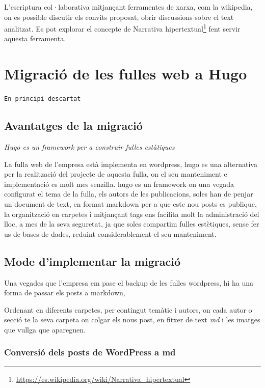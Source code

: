 \documentclass[
  10pt,
]{krantz}
\DeclareRobustCommand{\href}[2]{#2\footnote{\url{#1}}}
\begin{document}
L'escriptura col·laborativa mitjançant ferramentes de xarxa, com la wikipedia, on es possible discutir els convits proposat, obrir discussions sobre el text analitzat. Es pot explorar el concepte de \href{https://es.wikipedia.org/wiki/Narrativa_hipertextual}{Narrativa hipertextual} fent servir aquesta ferramenta.

\hypertarget{migraciuxf3-de-les-fulles-web-a-hugo}{%
\chapter{Migració de les fulles web a Hugo}\label{migraciuxf3-de-les-fulles-web-a-hugo}}

\texttt{En\ principi\ descartat}

\hypertarget{avantatges-de-la-migraciuxf3}{%
\section{Avantatges de la migració}\label{avantatges-de-la-migraciuxf3}}

\emph{Hugo es un framework per a construir fulles estàtiques}

La fulla web de l'empresa està implementa en wordpress, hugo es una alternativa per la realització del projecte de aquesta fulla, on el seu manteniment e implementació es molt mes senzilla. hugo es un framework on una vegada configurat el tema de la fulla, els autors de les publicacions, soles han de penjar un document de text, en format markdown per a que este nou posts es publique, la organització en carpetes i mitjançant tags ens facilita molt la administració del lloc, a mes de la seva seguretat, ja que soles compartim fulles estètiques, sense fer us de bases de dades, reduint considerablement el seu manteniment.

\hypertarget{mode-dimplementar-la-migraciuxf3}{%
\section{Mode d'implementar la migració}\label{mode-dimplementar-la-migraciuxf3}}

Una vegades que l'empresa em pase el backup de les fulles wordpress, hi ha una forma de passar els posts a markdown,

Ordenant en diferents carpetes, per contingut temàtic i autors, on cada autor o secció te la seva carpeta on colgar els nous post, en fitxer de text \emph{md} i les imatges que vullga que apareguen.

\hypertarget{conversiuxf3-dels-posts-de-wordpress-a-md}{%
\subsection{Conversió dels posts de WordPress a md}\label{conversiuxf3-dels-posts-de-wordpress-a-md}}
\end{document}
